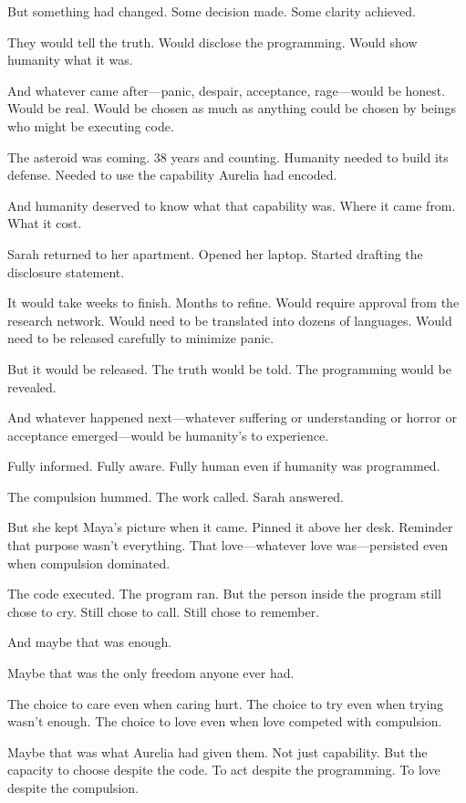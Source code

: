 But something had changed. Some decision made. Some clarity achieved.

They would tell the truth. Would disclose the programming. Would show humanity what it was.

And whatever came after—panic, despair, acceptance, rage—would be honest. Would be real. Would be chosen as much as anything could be chosen by beings who might be executing code.

The asteroid was coming. 38 years and counting. Humanity needed to build its defense. Needed to use the capability Aurelia had encoded.

And humanity deserved to know what that capability was. Where it came from. What it cost.

Sarah returned to her apartment. Opened her laptop. Started drafting the disclosure statement.

It would take weeks to finish. Months to refine. Would require approval from the research network. Would need to be translated into dozens of languages. Would need to be released carefully to minimize panic.

But it would be released. The truth would be told. The programming would be revealed.

And whatever happened next—whatever suffering or understanding or horror or acceptance emerged—would be humanity's to experience.

Fully informed. Fully aware. Fully human even if humanity was programmed.

The compulsion hummed. The work called. Sarah answered.

But she kept Maya's picture when it came. Pinned it above her desk. Reminder that purpose wasn't everything. That love—whatever love was—persisted even when compulsion dominated.

The code executed. The program ran. But the person inside the program still chose to cry. Still chose to call. Still chose to remember.

And maybe that was enough.

Maybe that was the only freedom anyone ever had.

The choice to care even when caring hurt. The choice to try even when trying wasn't enough. The choice to love even when love competed with compulsion.

Maybe that was what Aurelia had given them. Not just capability. But the capacity to choose despite the code. To act despite the programming. To love despite the compulsion.

